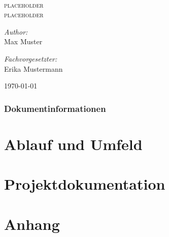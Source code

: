 \documentclass[a4paper,11pt,oneside]{report} %
\begin{document}
\begin{titlepage}
\begin{center}
\textsc{}\\[3cm]
\textsc{\LARGE placeholder}\\[1.5cm]
\textsc{\LARGE placeholder}\\[1.5cm]
\noindent
\begin{minipage}{0.4\textwidth}
\begin{flushleft} \large
\emph{Author:}\\
Max Muster
\end{flushleft}
\end{minipage}%
\begin{minipage}{0.4\textwidth}
\begin{flushright} \large
\emph{Fachvorgesetzter:} \\
Erika Mustermann
\end{flushright}
\end{minipage}
\vfill
{\large \today}
\end{center}
\end{titlepage}
\section{Dokumentinformationen}
\nopagebreak

\pagebreak
\tableofcontents
\lstlistoflistings
\listoffigures
\listoftables
\part{Ablauf und Umfeld}

\part{Projektdokumentation}

\part{Anhang}

\end{document}
